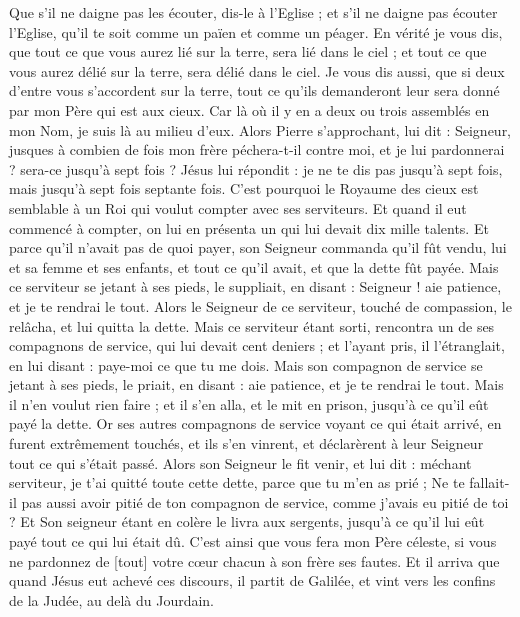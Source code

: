 \begin{multicols}{2}
Que s'il ne daigne pas les écouter, dis-le à l'Eglise ; et s'il ne daigne pas écouter l'Eglise, qu'il te soit comme un païen et comme un péager.
En vérité je vous dis, que tout ce que vous aurez lié sur la terre, sera lié dans le ciel ; et tout ce que vous aurez délié sur la terre, sera délié dans le ciel.
Je vous dis aussi, que si deux d'entre vous s'accordent sur la terre, tout ce qu'ils demanderont leur sera donné par mon Père qui est aux cieux.
Car là où il y en a deux ou trois assemblés en mon Nom, je suis là au milieu d'eux.
Alors Pierre s'approchant, lui dit : Seigneur, jusques à combien de fois mon frère péchera-t-il contre moi, et je lui pardonnerai ? sera-ce jusqu'à sept fois ?
Jésus lui répondit : je ne te dis pas jusqu'à sept fois, mais jusqu'à sept fois septante fois.
C'est pourquoi le Royaume des cieux est semblable à un Roi qui voulut compter avec ses serviteurs.
Et quand il eut commencé à compter, on lui en présenta un qui lui devait dix mille talents.
Et parce qu'il n'avait pas de quoi payer, son Seigneur commanda qu'il fût vendu, lui et sa femme et ses enfants, et tout ce qu'il avait, et que la dette fût payée.
Mais ce serviteur se jetant à ses pieds, le suppliait, en disant : Seigneur ! aie patience, et je te rendrai le tout.
Alors le Seigneur de ce serviteur, touché de compassion, le relâcha, et lui quitta la dette.
Mais ce serviteur étant sorti, rencontra un de ses compagnons de service, qui lui devait cent deniers ; et l'ayant pris, il l'étranglait, en lui disant : paye-moi ce que tu me dois.
Mais son compagnon de service se jetant à ses pieds, le priait, en disant : aie patience, et je te rendrai le tout.
Mais il n'en voulut rien faire ; et il s'en alla, et le mit en prison, jusqu'à ce qu'il eût payé la dette.
Or ses autres compagnons de service voyant ce qui était arrivé, en furent extrêmement touchés, et ils s'en vinrent, et déclarèrent à leur Seigneur tout ce qui s'était passé.
Alors son Seigneur le fit venir, et lui dit : méchant serviteur, je t'ai quitté toute cette dette, parce que tu m'en as prié ;
Ne te fallait-il pas aussi avoir pitié de ton compagnon de service, comme j'avais eu pitié de toi ?
Et Son seigneur étant en colère le livra aux sergents, jusqu'à ce qu'il lui eût payé tout ce qui lui était dû.
C'est ainsi que vous fera mon Père céleste, si vous ne pardonnez de [tout] votre cœur chacun à son frère ses fautes.
\VerseOne{}Et il arriva que quand Jésus eut achevé ces discours, il partit de Galilée, et vint vers les confins de la Judée, au delà du Jourdain.

\end{multicols}

